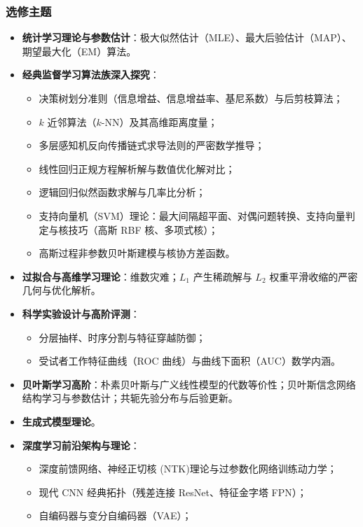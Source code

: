 \subsubsection{选修主题}
\begin{itemize}
    \item \textbf{统计学习理论与参数估计}：极大似然估计（MLE）、最大后验估计（MAP）、期望最大化（EM）算法。
    \item \textbf{经典监督学习算法族深入探究}：
    \begin{itemize}
        \item 决策树划分准则（信息增益、信息增益率、基尼系数）与后剪枝算法；
        \item $k$ 近邻算法（$k$-NN）及其高维距离度量；
        \item 多层感知机反向传播链式求导法则的严密数学推导；
        \item 线性回归正规方程解析解与数值优化解对比；
        \item 逻辑回归似然函数求解与几率比分析；
        \item 支持向量机（SVM）理论：最大间隔超平面、对偶问题转换、支持向量判定与核技巧（高斯 RBF 核、多项式核）；
        \item 高斯过程非参数贝叶斯建模与核协方差函数。
    \end{itemize}
    \item \textbf{过拟合与高维学习理论}：维数灾难；$L_1$ 产生稀疏解与 $L_2$ 权重平滑收缩的严密几何与优化解析。
    \item \textbf{科学实验设计与高阶评测}：
    \begin{itemize}
        \item 分层抽样、时序分割与特征穿越防御；
        \item 受试者工作特征曲线（ROC 曲线）与曲线下面积（AUC）数学内涵。
    \end{itemize}
    \item \textbf{贝叶斯学习高阶}：朴素贝叶斯与广义线性模型的代数等价性；贝叶斯信念网络结构学习与参数估计；共轭先验分布与后验更新。
    \item \textbf{生成式模型理论}。
    \item \textbf{深度学习前沿架构与理论}：
    \begin{itemize}
        \item 深度前馈网络、神经正切核 (NTK)理论与过参数化网络训练动力学；
        \item 现代 CNN 经典拓扑（残差连接 ResNet、特征金字塔 FPN）；
        \item 自编码器与变分自编码器（VAE）；

\end{itemize}
\end{itemize}
